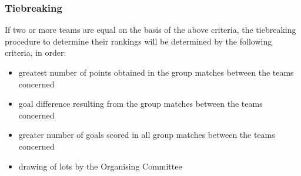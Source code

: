 \subsubsection{Tiebreaking}
If two or more teams are equal on the basis of the above criteria, the tiebreaking procedure to determine their rankings will be determined by the following criteria, in order:
\begin{itemize}
\item greatest number of points obtained in the group matches between the teams concerned
\item goal difference resulting from the group matches between the teams concerned
\item greater number of goals scored in all group matches between the teams concerned
\item drawing of lots by the Organising Committee
\end{itemize}

